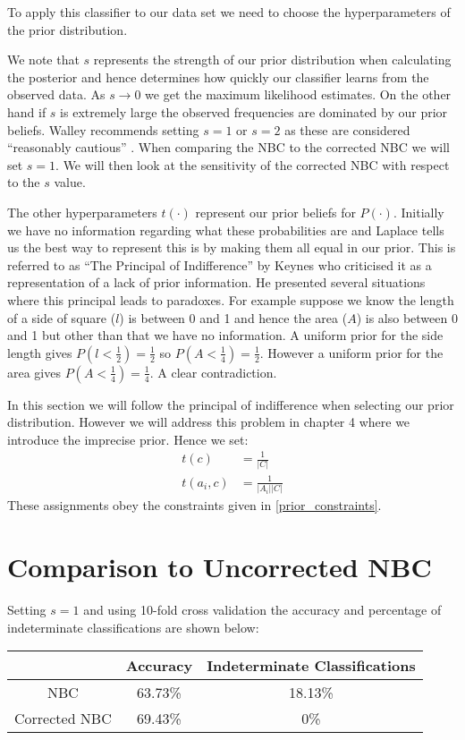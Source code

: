 To apply this classifier to our data set we need to choose the hyperparameters of the prior distribution.

We note that $s$ represents the strength of our prior distribution when calculating the posterior and hence determines how quickly our classifier learns from the observed data.
As $s \rightarrow 0$ we get the maximum likelihood estimates.
On the other hand if $s$ is extremely large the observed frequencies are dominated by our prior beliefs.
Walley recommends setting $s=1$ or $s=2$ as these are considered ``reasonably cautious'' \cite{Walley96}.
When comparing the NBC to the corrected NBC we will set $s=1$.
We will then look at the sensitivity of the corrected NBC with respect to the $s$ value.

The other hyperparameters $t(\cdot)$ represent our prior beliefs for $P(\cdot)$.
Initially we have no information regarding what these probabilities are and Laplace tells us \cite{Laplace1812} the best way to represent this is by making them all equal in our prior.
This is referred to as ``The Principal of Indifference'' by Keynes \cite{Keynes21} who criticised it as a representation of a lack of prior information.
He presented several situations where this principal leads to paradoxes.
For example suppose we know the length of a side of square ($l$) is between 0 and 1 and hence the area ($A$) is also between 0 and 1 but other than that we have no information.
A uniform prior for the side length gives $P(l < \frac{1}{2}) = \frac{1}{2}$ so $P(A < \frac{1}{4}) = \frac{1}{2}$.
However a uniform prior for the area gives $P(A < \frac{1}{4}) = \frac{1}{4}$.
A clear contradiction.

In this section we will follow the principal of indifference when selecting our prior distribution.
However we will address this problem in chapter 4 where we introduce the imprecise prior.
Hence we set:
\begin{align}\label{initial prior}
	t(c)      & = \frac{1}{|C|} \\
	t(a_i, c) & = \frac{1}{|A_i||C|}
\end{align}
These assignments obey the constraints given in \cref{prior_constraints}.

\section{Comparison to Uncorrected NBC}


Setting $s=1$ and using 10-fold cross validation the accuracy and percentage of indeterminate classifications are shown below:
\begin{center}
	\begin{tabular}{ c|c c }
		              & Accuracy & Indeterminate Classifications \\
		\hline
		NBC           & 63.73\%  & 18.13\%                       \\
		Corrected NBC & 69.43\%  & 0\%
	\end{tabular}
\end{center}

